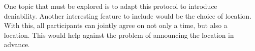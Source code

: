 One topic that must be explored is to adapt this protocol to introduce 
deniability.
Another interesting feature to include would be the choice of location.
With this, all participants can jointly agree on not only a time, but also 
a location.
This would help against the problem of announcing the location in advance.



%
